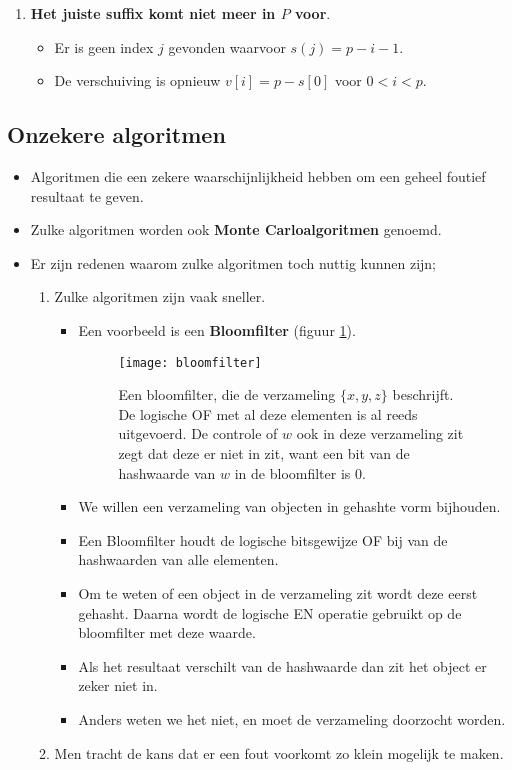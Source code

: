 \begin{itemize}
\begin{enumerate}
\begin{itemize}
        \end{itemize}
        \item \textbf{Het juiste suffix komt niet meer in $P$ voor}.
        \begin{itemize}
            \item Er is geen index $j$ gevonden waarvoor $s(j) = p - i - 1$.
            \item De verschuiving is opnieuw $v[i] = p - s[0]$ voor $0 < i < p$.
        \end{itemize}
    \end{enumerate}
\end{itemize}

\subsection{Onzekere algoritmen}
\begin{itemize}
    \item Algoritmen die een zekere waarschijnlijkheid hebben om een geheel foutief resultaat te geven.
    \item Zulke algoritmen worden ook \textbf{Monte Carloalgoritmen} genoemd.
    \item Er zijn redenen waarom zulke algoritmen toch nuttig kunnen zijn;
    \begin{enumerate}
        \item Zulke algoritmen zijn vaak sneller.
        \begin{itemize}
            \item Een voorbeeld is een \textbf{Bloomfilter} (figuur \ref{fig:bloomfilter}).
            \begin{figure}[ht]
                \centering
                \texttt{[image: bloomfilter]}
                \caption{Een bloomfilter, die de verzameling $\{x, y, z\}$ beschrijft. De logische OF met al deze elementen is al reeds uitgevoerd. De controle of $w$ ook in deze verzameling zit zegt dat deze er niet in zit, want een bit van de hashwaarde van $w$ in de bloomfilter is 0.}
                \label{fig:bloomfilter}
            \end{figure}
            \item We willen een verzameling van objecten in gehashte vorm bijhouden.
            \item Een Bloomfilter houdt de logische bitsgewijze OF bij van de hashwaarden van alle elementen.
            \item Om te weten of een object in de verzameling zit wordt deze eerst gehasht. Daarna wordt de logische EN operatie gebruikt op de bloomfilter met deze waarde.
            \item Als het resultaat verschilt van de hashwaarde dan zit het object er zeker niet in.
            \item Anders weten we het niet, en moet de verzameling doorzocht worden.
        \end{itemize}
        \item Men tracht de kans dat er een fout voorkomt zo klein mogelijk te maken.
    \end{enumerate}
\end{itemize}


